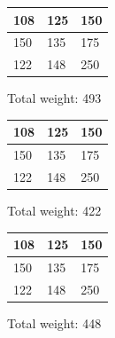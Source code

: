 \begin{figure}[H]
    \begin{minipage}[b]{0.3\textwidth}
      \centering
      \begin{tabular}{|m{0.5cm}|m{0.5cm}|m{0.5cm}|}
        \hline
        \cellcolor{yellow!25} 108 & 125 & 150 \\
        \hline
        150 & \cellcolor{yellow!25} 135 & 175 \\
        \hline
        122 & 148 & \cellcolor{yellow!25} 250 \\
        \hline
      \end{tabular}
      \caption{Total weight: 493}
      \label{tab:perm1}
    \end{minipage}
    \hfill
    \begin{minipage}[b]{0.3\textwidth}
      \centering
      \begin{tabular}{|m{0.5cm}|m{0.5cm}|m{0.5cm}|}
        \hline
        108 & \cellcolor{yellow!25} 125 & 150 \\
        \hline
        150 & 135 & \cellcolor{yellow!25}175 \\
        \hline
        \cellcolor{yellow!25}122 & 148 & 250 \\
        \hline
      \end{tabular}
      \caption{Total weight: 422}
      \label{tab:perm2}
    \end{minipage}
    \hfill
    \begin{minipage}[b]{0.3\textwidth}
      \centering
      \begin{tabular}{|m{0.5cm}|m{0.5cm}|m{0.5cm}|}
        \hline
        108 & 125 & \cellcolor{yellow!25}150 \\
        \hline
        \cellcolor{yellow!25} 150 &  135 & 175 \\
        \hline
        122 & \cellcolor{yellow!25} 148 & 250 \\
        \hline
      \end{tabular}
      \caption{Total weight: 448}
      \label{tab:perm3}
    \end{minipage}
  \end{figure}
  

